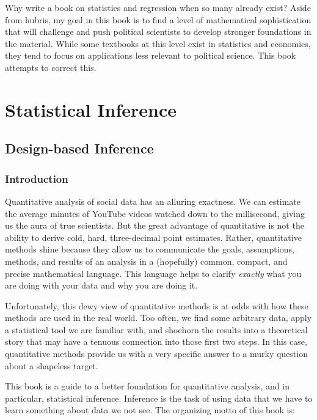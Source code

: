 \documentclass[
  letterpaper,
  DIV=11,
  numbers=noendperiod]{scrreprt}
\theoremstyle{definition}
\theoremstyle{definition}
\theoremstyle{plain}
\theoremstyle{remark}
\begin{document}
Why write a book on statistics and regression when so many already
exist? Aside from hubris, my goal in this book is to find a level of
mathematical sophistication that will challenge and push political
scientists to develop stronger foundations in the material. While some
textbooks at this level exist in statistics and economics, they tend to
focus on applications less relevant to political science. This book
attempts to correct this.

\part{Statistical Inference}

\hypertarget{design-based-inference}{%
\chapter{Design-based Inference}\label{design-based-inference}}

\hypertarget{introduction-1}{%
\section{Introduction}\label{introduction-1}}

Quantitative analysis of social data has an alluring exactness. We can
estimate the average minutes of YouTube videos watched down to the
millisecond, giving us the aura of true scientists. But the great
advantage of quantitative is not the ability to derive cold, hard,
three-decimal point estimates. Rather, quantitative methods shine
because they allow us to communicate the goals, assumptions, methods,
and results of an analysis in a (hopefully) common, compact, and precise
mathematical language. This language helps to clarify \emph{exactly}
what you are doing with your data and why you are doing it.

Unfortunately, this dewy view of quantitative methods is at odds with
how these methods are used in the real world. Too often, we find some
arbitrary data, apply a statistical tool we are familiar with, and
shoehorn the results into a theoretical story that may have a tenuous
connection into those first two steps. In this case, quantitative
methods provide us with a very specific answer to a murky question about
a shapeless target.

This book is a guide to a better foundation for quantitative analysis,
and in particular, statistical inference. Inference is the task of using
data that we have to learn something about data we not see. The
organizing motto of this book is:
\end{document}
